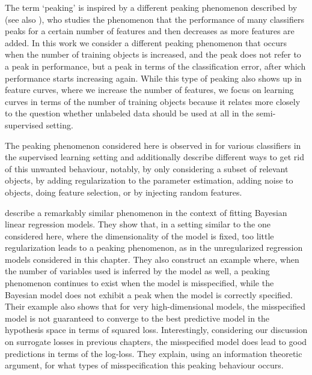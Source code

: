 \documentclass[twoside]{memoir}\usepackage[]{graphicx}\usepackage{xcolor}
\renewcommand{\cite}{\citep}
\begin{document}
The term `peaking' is inspired by a different peaking phenomenon described by \citet{Hughes1968} (see also \citet{Jain1982}), who studies the phenomenon that the performance of many classifiers peaks for a certain number of features and then decreases as more features are added. In this work we consider a different peaking phenomenon that occurs when the number of training objects is increased, and the peak does not refer to a peak in performance, but a peak in terms of the classification error, after which performance starts increasing again. While this type of peaking also shows up in feature curves, where we increase the number of features, we focus on learning curves in terms of the number of training objects because it relates more closely to the question whether unlabeled data should be used at all in the semi-supervised setting.

The peaking phenomenon considered here is observed in \cite{Duin1995,Skurichina1996,Opper1995,Duin2000,Opper2001} for various classifiers in the supervised learning setting and \cite{Duin1995,Skurichina1999,Duin2000,Opper2001} additionally describe different ways to get rid of this unwanted behaviour, notably, by only considering a subset of relevant objects, by adding regularization to the parameter estimation, adding noise to objects, doing feature selection, or by injecting random features. 

\citet{Grunwald2014} describe a remarkably similar phenomenon in the context of fitting Bayesian linear regression models. They show that, in a setting similar to the one considered here, where the dimensionality of the model is fixed, too little regularization leads to a peaking phenomenon, as in the unregularized regression models considered in this chapter. They also construct an example where, when the number of variables used is inferred by the model as well, a peaking phenomenon continues to exist when the model is misspecified, while the Bayesian model does not exhibit a peak when the model is correctly specified. Their example also shows that for very high-dimensional models, the misspecified model is not guaranteed to converge to the best predictive model in the hypothesis space in terms of squared loss. Interestingly, considering our discussion on surrogate losses in previous chapters, the misspecified model does lead to good predictions in terms of the log-loss. They explain, using an information theoretic argument, for what types of misspecification this peaking behaviour occurs. 
\end{document}
